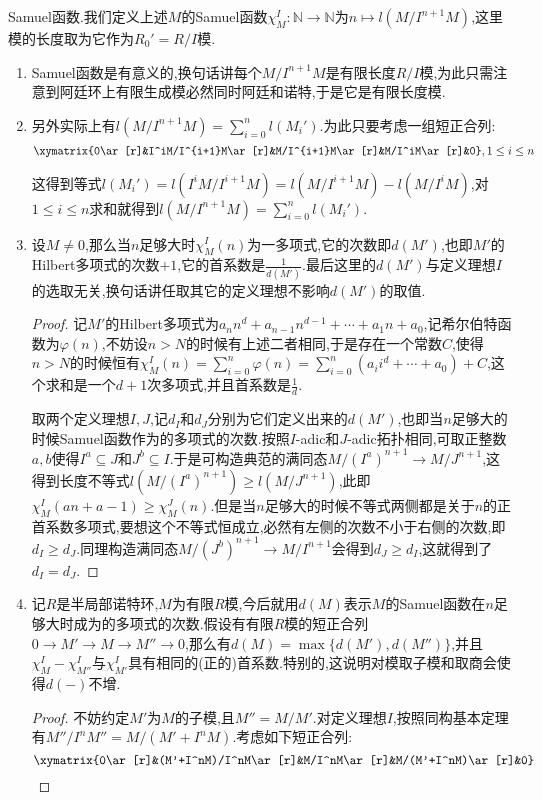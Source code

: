 Samuel函数.我们定义上述$M$的Samuel函数$\chi^I_M:\mathbb{N}\to\mathbb{N}$为$n\mapsto l(M/I^{n+1}M)$,这里模的长度取为它作为$R_0'=R/I$模.
\begin{enumerate}
	\item Samuel函数是有意义的,换句话讲每个$M/I^{n+1}M$是有限长度$R/I$模,为此只需注意到阿廷环上有限生成模必然同时阿廷和诺特,于是它是有限长度模.
	\item 另外实际上有$l(M/I^{n+1}M)=\sum_{i=0}^nl(M_i')$.为此只要考虑一组短正合列:
	$$\xymatrix{0\ar[r]&I^iM/I^{i+1}M\ar[r]&M/I^{i+1}M\ar[r]&M/I^iM\ar[r]&0},1\le i\le n$$
	
	这得到等式$l(M_i')=l(I^iM/I^{i+1}M)=l(M/I^{i+1}M)-l(M/I^iM)$,对$1\le i\le n$求和就得到$l(M/I^{n+1}M)=\sum_{i=0}^nl(M_i')$.
	\item 设$M\not=0$,那么当$n$足够大时$\chi_M^I(n)$为一多项式,它的次数即$d(M')$,也即$M'$的Hilbert多项式的次数$+1$,它的首系数是$\frac{1}{d(M')}$.最后这里的$d(M')$与定义理想$I$的选取无关,换句话讲任取其它的定义理想不影响$d(M')$的取值.
	\begin{proof}
		
		记$M'$的Hilbert多项式为$a_nn^d+a_{n-1}n^{d-1}+\cdots+a_1n+a_0$,记希尔伯特函数为$\varphi(n)$,不妨设$n>N$的时候有上述二者相同,于是存在一个常数$C$,使得$n>N$的时候恒有$\chi_M^I(n)=\sum_{i=0}^n\varphi(n)=\sum_{i=0}^n(a_ii^d+\cdots+a_0)+C$,这个求和是一个$d+1$次多项式,并且首系数是$\frac{1}{d}$.
		
		取两个定义理想$I,J$,记$d_I$和$d_J$分别为它们定义出来的$d(M')$,也即当$n$足够大的时候Samuel函数作为的多项式的次数.按照$I$-adic和$J$-adic拓扑相同,可取正整数$a,b$使得$I^a\subseteq J$和$J^b\subseteq I$.于是可构造典范的满同态$M/(I^a)^{n+1}\to M/J^{n+1}$,这得到长度不等式$l(M/(I^a)^{n+1})\ge l(M/J^{n+1})$,此即$\chi_M^I(an+a-1)\ge\chi_M^J(n)$.但是当$n$足够大的时候不等式两侧都是关于$n$的正首系数多项式,要想这个不等式恒成立,必然有左侧的次数不小于右侧的次数,即$d_I\ge d_J$.同理构造满同态$M/(J^b)^{n+1}\to M/I^{n+1}$会得到$d_J\ge d_I$,这就得到了$d_I=d_J$.
	\end{proof}
	\item 记$R$是半局部诺特环,$M$为有限$R$模,今后就用$d(M)$表示$M$的Samuel函数在$n$足够大时成为的多项式的次数.假设有有限$R$模的短正合列$0\to M'\to M\to M''\to0$,那么有$d(M)=\max\{d(M'),d(M'')\}$,并且$\chi^I_M-\chi^I_{M''}$与$\chi_{M'}^I$具有相同的(正的)首系数.特别的,这说明对模取子模和取商会使得$d(-)$不增.
	\begin{proof}
		
		不妨约定$M'$为$M$的子模,且$M''=M/M'$.对定义理想$I$,按照同构基本定理有$M''/I^nM''=M/(M'+I^nM)$.考虑如下短正合列:
		$$\xymatrix{0\ar[r]&(M'+I^nM)/I^nM\ar[r]&M/I^nM\ar[r]&M/(M'+I^nM)\ar[r]&0}$$
		

\end{proof}
\end{enumerate}
